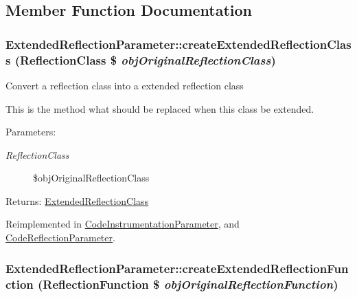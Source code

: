 \subsection{Member Function Documentation}
\hypertarget{class_extended_reflection_parameter_7119682d1601c3398cbad195a4d52b4a}{
\subsubsection[{createExtendedReflectionClass}]{\setlength{\rightskip}{0pt plus 5cm}ExtendedReflectionParameter::createExtendedReflectionClass (ReflectionClass \$ {\em objOriginalReflectionClass})}}
\label{class_extended_reflection_parameter_7119682d1601c3398cbad195a4d52b4a}


Convert a reflection class into a extended reflection class

This is the method what should be replaced when this class be extended.

\begin{Desc}
\item[Parameters:]
\begin{description}
\item[{\em ReflectionClass}]\$objOriginalReflectionClass \end{description}
\end{Desc}
\begin{Desc}
\item[Returns:]\hyperlink{class_extended_reflection_class}{ExtendedReflectionClass} \end{Desc}


Reimplemented in \hyperlink{class_code_instrumentation_parameter_4190025f9ec55f58f10b36084a8851fd}{CodeInstrumentationParameter}, and \hyperlink{class_code_reflection_parameter_a2b9b21f9711afbf11791dd64dcbdd0a}{CodeReflectionParameter}.\hypertarget{class_extended_reflection_parameter_8bea4c5548f8e5476b28c37b705dc25e}{
\subsubsection[{createExtendedReflectionFunction}]{\setlength{\rightskip}{0pt plus 5cm}ExtendedReflectionParameter::createExtendedReflectionFunction (ReflectionFunction \$ {\em objOriginalReflectionFunction})}}
\label{class_extended_reflection_parameter_8bea4c5548f8e5476b28c37b705dc25e}



